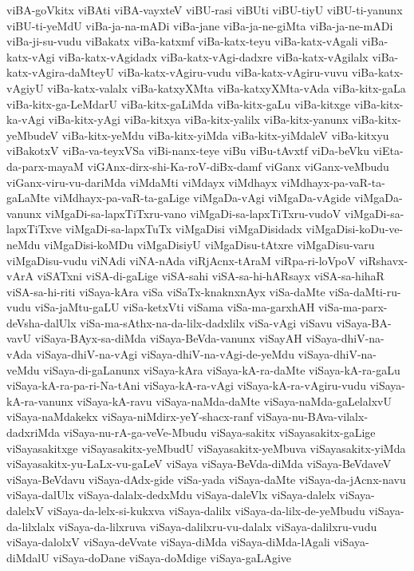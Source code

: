 {viBA-goVkitx
viBAti
viBA-vayxteV
viBU-rasi
viBUti
viBU-tiyU
viBU-ti-yanunx
viBU-ti-yeMdU
viBa-ja-na-mADi
viBa-jane
viBa-ja-ne-giMta
viBa-ja-ne-mADi
viBa-ji-su-vudu
viBakatx
viBa-katxmf
viBa-katx-teyu
viBa-katx-vAgali
viBa-katx-vAgi
viBa-katx-vAgidadx
viBa-katx-vAgi-dadxre
viBa-katx-vAgilalx
viBa-katx-vAgira-daMteyU
viBa-katx-vAgiru-vudu
viBa-katx-vAgiru-vuvu
viBa-katx-vAgiyU
viBa-katx-valalx
viBa-katxyXMta
viBa-katxyXMta-vAda
viBa-kitx-gaLa
viBa-kitx-ga-LeMdarU
viBa-kitx-gaLiMda
viBa-kitx-gaLu
viBa-kitxge
viBa-kitx-ka-vAgi
viBa-kitx-yAgi
viBa-kitxya
viBa-kitx-yalilx
viBa-kitx-yanunx
viBa-kitx-yeMbudeV
viBa-kitx-yeMdu
viBa-kitx-yiMda
viBa-kitx-yiMdaleV
viBa-kitxyu
viBakotxV
viBa-va-teyxVSa
viBi-nanx-teye
viBu
viBu-tAvxtf
viDa-beVku
viEta-da-parx-mayaM
viGAnx-dirx-shi-Ka-roV-diBx-damf
viGanx
viGanx-veMbudu
viGanx-viru-vu-dariMda
viMdaMti
viMdayx
viMdhayx
viMdhayx-pa-vaR-ta-gaLaMte
viMdhayx-pa-vaR-ta-gaLige
viMgaDa-vAgi
viMgaDa-vAgide
viMgaDa-vanunx
viMgaDi-sa-lapxTiTxru-vano
viMgaDi-sa-lapxTiTxru-vudoV
viMgaDi-sa-lapxTiTxve
viMgaDi-sa-lapxTuTx
viMgaDisi
viMgaDisidadx
viMgaDisi-koDu-ve-neMdu
viMgaDisi-koMDu
viMgaDisiyU
viMgaDisu-tAtxre
viMgaDisu-varu
viMgaDisu-vudu
viNAdi
viNA-nAda
viRjAcnx-tAraM
viRpa-ri-loVpoV
viRshavx-vArA
viSATxni
viSA-di-gaLige
viSA-sahi
viSA-sa-hi-hARsayx
viSA-sa-hihaR
viSA-sa-hi-riti
viSaya-kAra
viSa
viSaTx-knaknxnAyx
viSa-daMte
viSa-daMti-ru-vudu
viSa-jaMtu-gaLU
viSa-ketxVti
viSama
viSa-ma-garxhAH
viSa-ma-parx-deVsha-dalUlx
viSa-ma-sAthx-na-da-lilx-dadxlilx
viSa-vAgi
viSavu
viSaya-BA-vavU
viSaya-BAyx-sa-diMda
viSaya-BeVda-vanunx
viSayAH
viSaya-dhiV-na-vAda
viSaya-dhiV-na-vAgi
viSaya-dhiV-na-vAgi-de-yeMdu
viSaya-dhiV-na-veMdu
viSaya-di-gaLanunx
viSaya-kAra
viSaya-kA-ra-daMte
viSaya-kA-ra-gaLu
viSaya-kA-ra-pa-ri-Na-tAni
viSaya-kA-ra-vAgi
viSaya-kA-ra-vAgiru-vudu
viSaya-kA-ra-vanunx
viSaya-kA-ravu
viSaya-naMda-daMte
viSaya-naMda-gaLelalxvU
viSaya-naMdakekx
viSaya-niMdirx-yeY-shacx-ranf
viSaya-nu-BAva-vilalx-dadxriMda
viSaya-nu-rA-ga-veVe-Mbudu
viSaya-sakitx
viSayasakitx-gaLige
viSayasakitxge
viSayasakitx-yeMbudU
viSayasakitx-yeMbuva
viSayasakitx-yiMda
viSayasakitx-yu-LaLx-vu-gaLeV
viSaya
viSaya-BeVda-diMda
viSaya-BeVdaveV
viSaya-BeVdavu
viSaya-dAdx-gide
viSa-yada
viSaya-daMte
viSaya-da-jAcnx-navu
viSaya-dalUlx
viSaya-dalalx-dedxMdu
viSaya-daleVlx
viSaya-dalelx
viSaya-dalelxV
viSaya-da-lelx-si-kukxva
viSaya-dalilx
viSaya-da-lilx-de-yeMbudu
viSaya-da-lilxlalx
viSaya-da-lilxruva
viSaya-dalilxru-vu-dalalx
viSaya-dalilxru-vudu
viSaya-dalolxV
viSaya-deVvate
viSaya-diMda
viSaya-diMda-lAgali
viSaya-diMdalU
viSaya-doDane
viSaya-doMdige
viSaya-gaLAgive
}
